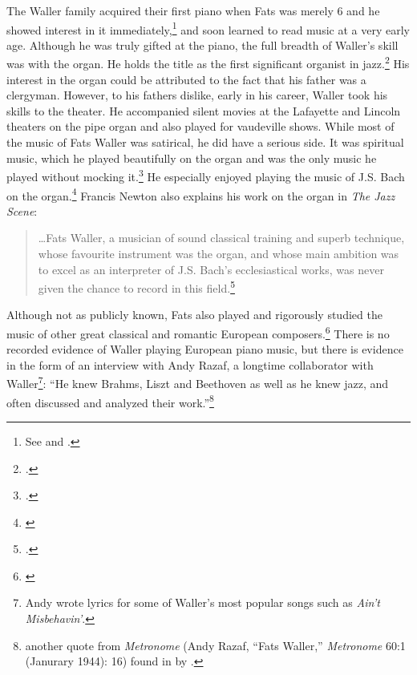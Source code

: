 \documentclass[11pt]{report}
\begin{document}
	\label{sec:organ_and_classical}
	The Waller family acquired their first piano when Fats was merely 6 and he showed interest in it immediately,\footnote{See \cite{transcriptions} and \cite{life}.} and soon learned to read music at a very early age. Although he was truly gifted at the piano, the full breadth of Waller's skill was with the organ. He holds the title as the first significant organist in jazz.\footnote{\cite[40]{grove-book:waller}.} His interest in the organ could be attributed to the fact that his father was a clergyman. However, to his fathers dislike, early in his career, Waller took his skills to the theater. He accompanied silent movies at the Lafayette and Lincoln theaters on the pipe organ and also played for vaudeville shows. While most of the music of Fats Waller was satirical, he did have a serious side. It was spiritual music, which he played beautifully on the organ and was the only music he played without mocking it.\footnote{\cite[8]{outside-insider}.} He especially enjoyed playing the music of J.S. Bach on the organ.\footnote{\cite[143]{visions}} Francis Newton also explains his work on the organ in \emph{The Jazz Scene}:

	\begin{quote}
		\ldots Fats Waller, a musician of sound classical training and superb technique, whose favourite instrument was the organ, and whose main ambition was to excel as an interpreter of J.S. Bach's ecclesiastical works, was never given the chance to record in this field.\footnote{\cite[209]{jazz_scene}.}
	\end{quote}
	
	Although not as publicly known, Fats also played and rigorously studied the music of other great classical and romantic European composers.\footnote{\cite[3]{life}} There is no recorded evidence of Waller playing European piano music, but there is evidence in the form of an interview with Andy Razaf, a longtime collaborator with Waller\footnote{Andy wrote lyrics for some of Waller's most popular songs such as \emph{Ain't Misbehavin'}.}: ``He knew Brahms, Liszt and Beethoven as well as he knew jazz, and often discussed and analyzed their work.''\footnote{another quote from \emph{Metronome} (Andy Razaf, ``Fats Waller,'' \emph{Metronome} 60:1 (Janurary 1944): 16) found in  by \cite{transcriptions}.}
	
\end{document}
